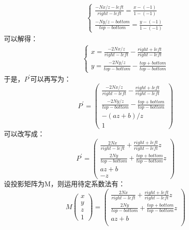 \begin{spacing}{2.5}
\begin{equation}
\begin{split}
		\left\{\begin{matrix}
		\frac{-Nx/z-left}{right-left}=\frac{x-(-1)}{1-(-1)}\\ 
		\frac{-Ny/z-bottom}{top-bottom} = \frac{y-(-1)}{1-(-1)}
		\end{matrix}\right.
		\end{split}
	\end{equation}
	可以解得：
	\begin{equation}
		\begin{split}
		\left\{\begin{matrix}
		x=\frac{-2Nx/z}{right-left}-\frac{right+left}{right-left}\\ 
		y=\frac{-2Ny/z}{top-bottom} - \frac{top+bottom}{top-bottom}
		\end{matrix}\right.
		\end{split}
	\end{equation}
	于是，$P^{'}$可以再写为：
	\begin{equation}
		P^{'}=\begin{pmatrix}
		\frac{-2Nx/z}{right-left}-\frac{right+left}{right-left}\\ 
		\frac{-2Ny/z}{top-bottom} - \frac{top+bottom}{top-bottom}\\ 
		-(az+b)/z\\ 
		1
	\end{pmatrix}
	\end{equation}
	可以改写成：
	\begin{equation}
		P^{'}=\begin{pmatrix}
		\frac{2Nx}{right-left}+\frac{right+left}{right-left}z\\ 
		\frac{2Ny}{top-bottom} + \frac{top+bottom}{top-bottom}z\\ 
		az+b\\ 
		-z
	\end{pmatrix}
	\end{equation}
	设投影矩阵为M，则运用待定系数法有：
	\begin{equation}
	M\begin{pmatrix}
		x\\ 
		y\\ 
		z\\ 
		1
	\end{pmatrix}=\begin{pmatrix}
		\frac{2Nx}{right-left}+\frac{right+left}{right-left}z\\ 
		\frac{2Ny}{top-bottom} + \frac{top+bottom}{top-bottom}z\\ 
		az+b\\ 

\end{pmatrix}
\end{equation}
\end{spacing}
